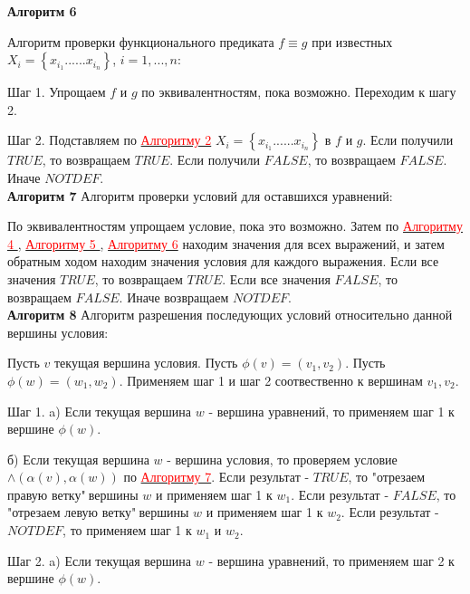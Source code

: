 \documentclass[12pt]{article}
\begin{document}
      \hypertarget{a6}{{\bf Алгоритм 6}} Алгоритм проверки функционального предиката $f \equiv g $ при известных $ X_{i} = \left\lbrace x_{i_{1}} ......x_{i_{n}}\right\rbrace $, $i = 1,...,n$:
      
      Шаг 1. Упрощаем $f$ и $g$ по эквивалентностям, пока возможно. Переходим к шагу 2.
      
      Шаг 2. Подставляем по \hyperlink{a2}{ \textcolor{red}{Алгоритму 2}} $ X_{i} = \left\lbrace x_{i_{1}} ......x_{i_{n}}\right\rbrace $ в $f$ и $g$. Если получили $TRUE$, то возвращаем  $TRUE$.  Если получили $FALSE$, то возвращаем  $FALSE$. Иначе $NOTDEF$.
     \\
     
    
      
      \hypertarget{a7}{{\bf Алгоритм 7}} Алгоритм проверки условий для оставшихся уравнений:
     
       
       По эквивалентностям упрощаем условие, пока это возможно. Затем по   \hyperlink{a4}{ \textcolor{red}{Алгоритму 4 }},  \hyperlink{a5}{ \textcolor{red}{Алгоритму 5 }},  \hyperlink{a6}{ \textcolor{red}{Алгоритму 6}} находим значения для всех выражений, и затем обратным ходом находим значения условия для каждого выражения.  Если все значения $TRUE$, то возвращаем $TRUE$. Если все значения $FALSE$, то возвращаем $FALSE$. Иначе возвращаем $NOTDEF$.
      \\
      
      \hypertarget{a8}{{\bf Алгоритм 8}} Алгоритм разрешения последующих условий относительно данной вершины условия:
      
       Пусть $v$ текущая вершина условия. Пусть $\phi(v)=(v_{1},v_{2})$. Пусть $\phi(w)=(w_{1},w_{2})$. Применяем шаг 1 и шаг 2 соотвественно к вершинам $v_{1},v_{2}$.
       
       Шаг 1. a) Если текущая вершина $w$ - вершина уравнений, то применяем шаг 1 к вершине $\phi(w)$. 
       
       б) Если текущая вершина $w$ - вершина условия, то проверяем условие $\wedge(\alpha(v),\alpha(w))$ по  \hyperlink{a7}{ \textcolor{red}{Алгоритму 7}}. Если результат - $TRUE$, то "отрезаем правую ветку"$\:$вершины $w$ и применяем шаг 1 к $w_{1}$. Если результат - $FALSE$, то "отрезаем левую ветку"$\:$вершины $w$ и применяем шаг 1 к $w_{2}$. Если результат - $NOTDEF$, то применяем шаг 1 к $w_{1}$ и $w_{2}$. 
       
       Шаг 2. a) Если текущая вершина $w$ - вершина уравнений, то применяем шаг 2 к вершине $\phi(w)$.
       
\end{document}
